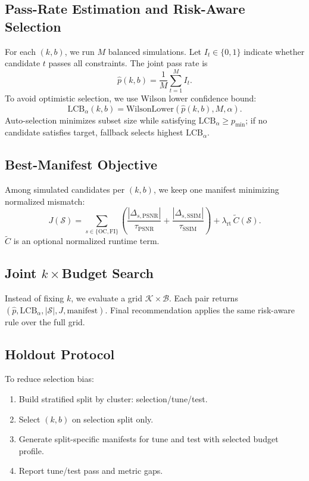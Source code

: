 \documentclass[10pt,twocolumn,letterpaper]{article}
\begin{document}
\subsection{Pass-Rate Estimation and Risk-Aware Selection}
For each \((k,b)\), we run \(M\) balanced simulations. Let \(I_t\in\{0,1\}\) indicate whether candidate \(t\) passes all constraints. The joint pass rate is
\begin{equation}
\hat p(k,b)=\frac{1}{M}\sum_{t=1}^M I_t.
\end{equation}
To avoid optimistic selection, we use Wilson lower confidence bound:
\begin{equation}
\mathrm{LCB}_{\alpha}(k,b)=\mathrm{WilsonLower}(\hat p(k,b),M,\alpha).
\end{equation}
Auto-selection minimizes subset size while satisfying \(\mathrm{LCB}_{\alpha}\ge p_{\min}\); if no candidate satisfies target, fallback selects highest \(\mathrm{LCB}_{\alpha}\).

\subsection{Best-Manifest Objective}
Among simulated candidates per \((k,b)\), we keep one manifest minimizing normalized mismatch:
\begin{equation}
J(\mathcal{S})=
\sum_{s\in\{\text{OC},\text{FI}\}}
\left(
\frac{|\Delta_{s,\text{PSNR}}|}{\tau_{\text{PSNR}}} +
\frac{|\Delta_{s,\text{SSIM}}|}{\tau_{\text{SSIM}}}
\right)
+\lambda_{\text{rt}}\,\widetilde{C}(\mathcal{S}).
\end{equation}
\(\widetilde{C}\) is an optional normalized runtime term.

\subsection{Joint \texorpdfstring{\(k\times\)}{k x}Budget Search}
Instead of fixing \(k\), we evaluate a grid \(\mathcal{K}\times\mathcal{B}\). Each pair returns \((\hat p,\mathrm{LCB}_{\alpha},|\mathcal{S}|,J,\text{manifest})\). Final recommendation applies the same risk-aware rule over the full grid.

\subsection{Holdout Protocol}
To reduce selection bias:
\begin{enumerate}[leftmargin=*,itemsep=0pt]
\item Build stratified split by cluster: selection/tune/test.
\item Select \((k,b)\) on selection split only.
\item Generate split-specific manifests for tune and test with selected budget profile.
\item Report tune/test pass and metric gaps.
\end{enumerate}
\end{document}
